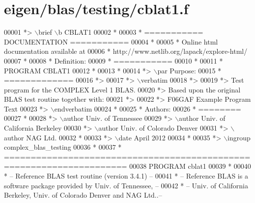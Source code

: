 \hypertarget{eigen_2blas_2testing_2cblat1_8f_source}{}\section{eigen/blas/testing/cblat1.f}
\label{eigen_2blas_2testing_2cblat1_8f_source}

\begin{DoxyCode}
00001 \textcolor{comment}{*> \(\backslash\)brief \(\backslash\)b CBLAT1}
00002 \textcolor{comment}{*}
00003 \textcolor{comment}{*  =========== DOCUMENTATION ===========}
00004 \textcolor{comment}{*}
00005 \textcolor{comment}{* Online html documentation available at }
00006 \textcolor{comment}{*            http://www.netlib.org/lapack/explore-html/ }
00007 \textcolor{comment}{*}
00008 \textcolor{comment}{*  Definition:}
00009 \textcolor{comment}{*  ===========}
00010 \textcolor{comment}{*}
00011 \textcolor{comment}{*       PROGRAM CBLAT1}
00012 \textcolor{comment}{* }
00013 \textcolor{comment}{*}
00014 \textcolor{comment}{*> \(\backslash\)par Purpose:}
00015 \textcolor{comment}{*  =============}
00016 \textcolor{comment}{*>}
00017 \textcolor{comment}{*> \(\backslash\)verbatim}
00018 \textcolor{comment}{*>}
00019 \textcolor{comment}{*>    Test program for the COMPLEX Level 1 BLAS.}
00020 \textcolor{comment}{*>    Based upon the original BLAS test routine together with:}
00021 \textcolor{comment}{*>}
00022 \textcolor{comment}{*>    F06GAF Example Program Text}
00023 \textcolor{comment}{*> \(\backslash\)endverbatim}
00024 \textcolor{comment}{*}
00025 \textcolor{comment}{*  Authors:}
00026 \textcolor{comment}{*  ========}
00027 \textcolor{comment}{*}
00028 \textcolor{comment}{*> \(\backslash\)author Univ. of Tennessee }
00029 \textcolor{comment}{*> \(\backslash\)author Univ. of California Berkeley }
00030 \textcolor{comment}{*> \(\backslash\)author Univ. of Colorado Denver }
00031 \textcolor{comment}{*> \(\backslash\)author NAG Ltd. }
00032 \textcolor{comment}{*}
00033 \textcolor{comment}{*> \(\backslash\)date April 2012}
00034 \textcolor{comment}{*}
00035 \textcolor{comment}{*> \(\backslash\)ingroup complex\_blas\_testing}
00036 \textcolor{comment}{*}
00037 \textcolor{comment}{*  =====================================================================}
00038       \textcolor{keyword}{PROGRAM} cblat1
00039 \textcolor{comment}{*}
00040 \textcolor{comment}{*  -- Reference BLAS test routine (version 3.4.1) --}
00041 \textcolor{comment}{*  -- Reference BLAS is a software package provided by Univ. of Tennessee,    --}
00042 \textcolor{comment}{*  -- Univ. of California Berkeley, Univ. of Colorado Denver and NAG Ltd..--}

\end{DoxyCode}
